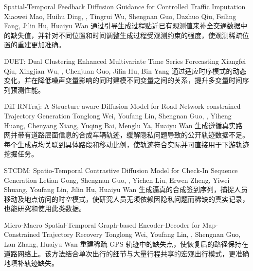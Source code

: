 {Spatial-Temporal Feedback Diffusion Guidance for Controlled Traffic Imputation}
{Xiaowei Mao, Huihu Ding, \me, Tingrui Wu, Shengnan Guo, Dazhuo Qiu, Feiling Fang, Jilin Hu, Huaiyu Wan}
{通过引导生成过程贴近已有观测值来补全交通数据中的缺失值，并针对不同位置和时间调整生成过程受观测约束的强度，使观测稀疏位置的重建更加准确。}

{DUET: Dual Clustering Enhanced Multivariate Time Series Forecasting}
{Xiangfei Qiu, Xingjian Wu, \me, Chenjuan Guo, Jilin Hu, Bin Yang}
{通过适应时序模式的动态变化，并在降低噪声变量影响的同时建模不同变量之间的关系，提升多变量时间序列预测性能。}

{Diff-RNTraj: A Structure-aware Diffusion Model for Road Network-constrained Trajectory Generation}
{Tonglong Wei, Youfang Lin, Shengnan Guo, \me, Yiheng Huang, Chenyang Xiang, Yuqing Bai, Menglu Ya, Huaiyu Wan}
{生成遵循真实路网并带有道路层面信息的合成车辆轨迹，缓解隐私问题导致的公开轨迹数据不足。每个生成点均关联到具体路段和移动比例，使轨迹符合实际并可直接用于下游轨迹挖掘任务。}

{STCDM: Spatio-Temporal Contrastive Diffusion Model for Check-In Sequence Generation}
{Letian Gong, Shengnan Guo, \me, Yichen Liu, Erwen Zheng, Yiwei Shuang, Youfang Lin, Jilin Hu, Huaiyu Wan}
{生成逼真的合成签到序列，捕捉人员移动及地点访问的时空模式，使研究人员无须依赖因隐私问题而稀缺的真实记录，也能研究和使用此类数据。}

{Micro-Macro Spatial-Temporal Graph-based Encoder-Decoder for Map-Constrained Trajectory Recovery}
{Tonglong Wei, Youfang Lin, \me, Shengnan Guo, Lan Zhang, Huaiyu Wan}
{重建稀疏 GPS 轨迹中的缺失点，使恢复后的路径保持在道路网络上。该方法结合单次出行的细节与大量行程共享的宏观出行模式，更准确地填补轨迹缺失。}

